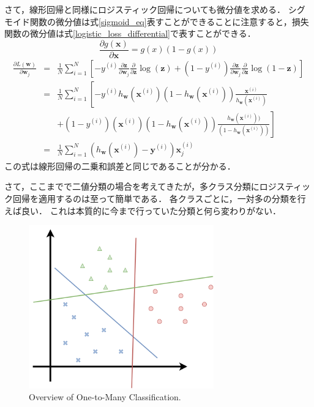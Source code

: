     さて，線形回帰と同様にロジスティック回帰についても微分値を求める．
    シグモイド関数の微分値は式\ref{sigmoid_eq}表すことができることに注意すると，損失関数の微分値は式\ref{logistic_loss_differential}で表すことができる．
    \begin{equation}
        \frac{\partial g(\boldsymbol{x})}{\partial \boldsymbol{x}} = g(x) (1-g(x))
        \label{sigmoid_eq}
    \end{equation}
    \begin{eqnarray}
        \frac{\partial L(\boldsymbol{w})}{\partial \boldsymbol{w}_j} 
        &=& \frac{1}{N}\sum^N_{i=1}\left[-y^{(i)} \frac{\partial \bm{z}}{\partial \boldsymbol{w}_j}\frac{\partial }{\partial \boldsymbol{z}}\log(\bm{z}) + (1-y^{(i)})\frac{\partial \bm{z}}{\partial \boldsymbol{w}_j}\frac{\partial }{\partial \boldsymbol{z}}\log(1-\bm{z})\right]\\
        &=& \frac{1}{N}\sum^N_{i=1} \left[-y^{(i)} h_{\bm{w}}(\bm{x}^{(i)})(1-h_{\bm{w}}(\bm{x}^{(i)}))\frac{\bm{x}^{(i)}}{h_{\bm{w}}(\bm{x}^{(i)})} \right.\\ 
        &&  \left.+(1-y^{(i)})(\bm{x}^{(i)})(1-h_{\bm{w}}(\bm{x}^{(i)}))\frac{h_{\bm{w}}(\bm{x}^{(i)}))}{(1-h_{\bm{w}}(\bm{x}^{(i)}))}\right] \\
        &=& \frac{1}{N}\sum^N_{i=1}\left(h_{\bm{w}}(\bm{x}^{(i)})-\bm{y}^{(i)}\right)\bm{x}^{(i)}_j
        \label{logistic_loss_differential}
    \end{eqnarray}
    この式は線形回帰の二乗和誤差と同じであることが分かる．
    
    さて，ここまでで二値分類の場合を考えてきたが，多クラス分類にロジスティック回帰を適用するのは至って簡単である．
    各クラスごとに，一対多の分類を行えば良い．
    これは本質的に今まで行っていた分類と何ら変わりがない．
    \begin{figure}[ht]
        \begin{center}
            \includegraphics[width=8.0cm]{./8_appendix/img/one_vs_all}
            \caption{Overview of One-to-Many Classification.}
            \label{2_one_vs_all}
        \end{center}
    \end{figure}
    
